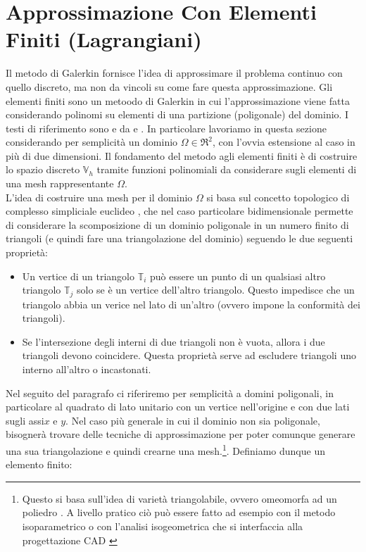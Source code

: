 \documentclass[12pt,a4paper]{report}
\theoremstyle{theorem}
\theoremstyle{theorem}
\theoremstyle{definition}
\begin{document}
\section{Approssimazione Con Elementi Finiti (Lagrangiani)}
Il metodo di Galerkin fornisce l'idea di approssimare il problema continuo con quello discreto, ma non da vincoli su come fare questa approssimazione. Gli elementi finiti sono un metoodo di Galerkin in cui l'approssimazione viene fatta considerando polinomi su elementi di una partizione (poligonale) del dominio. I testi di riferimento sono \cite{BS} e da \cite{Ciarlet} e \cite{Q}. In particolare lavoriamo in questa sezione considerando per semplicità un dominio $\Omega \in \Re^{2}$, con l'ovvia estensione al caso in più di due dimensioni.
Il fondamento del metodo agli elementi finiti è di costruire lo spazio discreto $\mathbb{V}_h$ tramite funzioni polinomiali da considerare sugli elementi di una mesh rappresentante $\Omega$. \\
L'idea di costruire una mesh per il dominio $\Omega$ si basa sul concetto topologico di complesso simpliciale euclideo \cite[Capitolo~2]{FerrarioSimpl}, che nel caso particolare  bidimensionale permette di considerare la scomposizione di un dominio poligonale in un numero finito di triangoli (e quindi fare una triangolazione del dominio) seguendo le due seguenti proprietà: \label{Triangolazione}
\begin{itemize}
	\item Un vertice di un triangolo $\mathbb{T}_{i}$ può essere un punto di un qualsiasi altro triangolo $\mathbb{T}_{j}$ solo se è un vertice dell'altro triangolo. Questo impedisce che un triangolo abbia un verice nel lato di un'altro (ovvero impone la conformità dei triangoli).
	\item Se l'intersezione degli interni di due triangoli non è vuota, allora i due triangoli devono coincidere. Questa proprietà serve ad escludere triangoli uno interno all'altro o incastonati.
\end{itemize}
Nel seguito del paragrafo ci riferiremo per semplicità a domini poligonali, in particolare al quadrato di lato unitario con un vertice nell'origine e con due lati sugli assi$x$ e $y$. Nel caso più generale in cui il dominio non sia poligonale, bisognerà trovare delle tecniche di approssimazione per poter comunque generare una sua triangolazione e quindi crearne una mesh.\footnote{Questo si basa sull'idea di varietà triangolabile, ovvero omeomorfa ad un poliedro \cite[Chapter~5]{FerrarioSimpl}. A livello pratico ciò può essere fatto ad esempio con il metodo isoparametrico \cite{lenoir1986optimal} o con l'analisi isogeometrica che si interfaccia alla progettazione CAD \cite{CHYisogeometric}}. Definiamo dunque un elemento finito:
\end{document}
